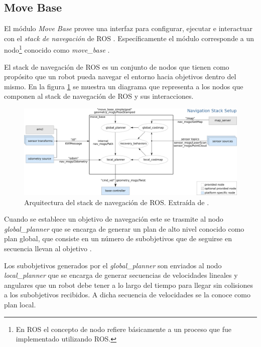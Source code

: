 \subsection{Move Base}\label{subsec:move_base}
El módulo \emph{Move Base} provee una interfaz para configurar, ejecutar e
interactuar con el \emph{stack de navegación} de \gls{ROS}
\cite{ROS-navigation}. Específicamente el módulo corresponde a un
nodo\footnote{En \gls{ROS} el concepto de nodo refiere básicamente a un proceso
  que fue implementado utilizando ROS.} conocido como \emph{move\_base}
  \cite{ROS-move_base}. 

El stack de navegación de \gls{ROS} es un conjunto de nodos que tienen como propósito
que un robot pueda navegar el entorno hacia objetivos dentro del mismo. En la
figura \ref{fig:move_base} se muestra un diagrama que representa a los nodos que
componen al stack de navegación de \gls{ROS} y sus interacciones.

\begin{figure}[H]
  \center
  \includegraphics[width=1\linewidth]{imagenes/move_base.png}
  \caption[Arquitectura del stack de navegación de ROS.]{Arquitectura del stack de navegación de \gls{ROS}. Extraída de \cite{ROS-move_base}.}
  \label{fig:move_base}
\end{figure} 

Cuando se establece un objetivo de navegación este se trasmite al nodo
\emph{global\_planner} que se encarga de generar un plan de alto nivel
conocido como plan global, que consiste en un número de subobjetivos que de
seguirse en secuencia llevan al objetivo .

Los subobjetivos generados por el \emph{global\_planner} son enviados al nodo
\emph{local\_planner} que se encarga de generar secuencias de velocidades
lineales y angulares que un robot debe tener a lo largo del tiempo para llegar
sin colisiones a los subobjetivos recibidos. A dicha secuencia de velocidades
se la conoce como plan local.


